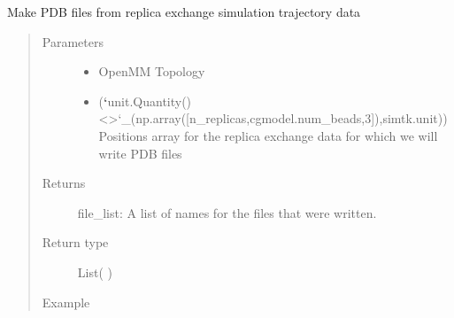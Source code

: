 \documentclass[letterpaper,12pt,english,openany,oneside]{sphinxmanual}
\begin{document}

\begin{fulllineitems}
\label{\detokenize{simulation:simulation.rep_exch.make_replica_pdb_files}}
Make PDB files from replica exchange simulation trajectory data
\begin{quote}\begin{description}
\item[{Parameters}] \leavevmode\begin{itemize}
\item {} 
 \textendash{} OpenMM Topology

\item {} 
 ({\color{red}\bfseries{}{}`}unit.Quantity() \textless{}\textgreater{}{}`\_(np.array({[}n\_replicas,cgmodel.num\_beads,3{]}),simtk.unit)) \textendash{} Positions array for the replica exchange data for which we will write PDB files

\end{itemize}

\item[{Returns}] \leavevmode
file\_list: A list of names for the files that were written.

\item[{Return type}] \leavevmode
List(  )

\item[{Example}] \leavevmode
\end{description}\end{quote}


\end{fulllineitems}
\end{document}
